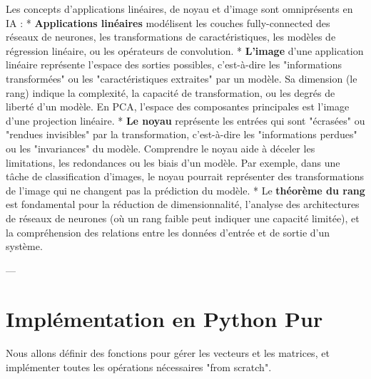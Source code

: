 \documentclass{report}
\begin{document}
Les concepts d'applications linéaires, de noyau et d'image sont omniprésents en IA :
*   \textbf{Applications linéaires} modélisent les couches fully-connected des réseaux de neurones, les transformations de caractéristiques, les modèles de régression linéaire, ou les opérateurs de convolution.
*   \textbf{L'image} d'une application linéaire représente l'espace des sorties possibles, c'est-à-dire les "informations transformées" ou les "caractéristiques extraites" par un modèle. Sa dimension (le rang) indique la complexité, la capacité de transformation, ou les degrés de liberté d'un modèle. En PCA, l'espace des composantes principales est l'image d'une projection linéaire.
*   \textbf{Le noyau} représente les entrées qui sont "écrasées" ou "rendues invisibles" par la transformation, c'est-à-dire les "informations perdues" ou les "invariances" du modèle. Comprendre le noyau aide à déceler les limitations, les redondances ou les biais d'un modèle. Par exemple, dans une tâche de classification d'images, le noyau pourrait représenter des transformations de l'image qui ne changent pas la prédiction du modèle.
*   Le \textbf{théorème du rang} est fondamental pour la réduction de dimensionnalité, l'analyse des architectures de réseaux de neurones (où un rang faible peut indiquer une capacité limitée), et la compréhension des relations entre les données d'entrée et de sortie d'un système.

---

\section*{Implémentation en Python Pur}

Nous allons définir des fonctions pour gérer les vecteurs et les matrices, et implémenter toutes les opérations nécessaires "from scratch".
\end{document}
